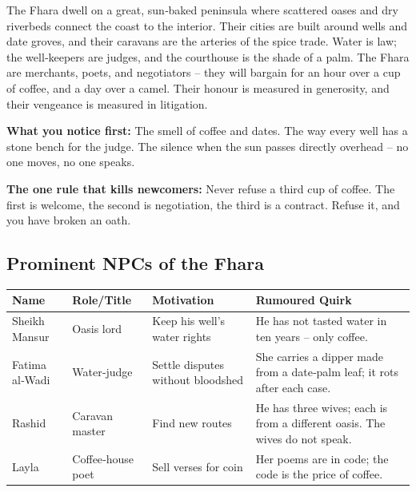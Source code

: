\documentclass[11pt]{book}
\begin{document}
\begin{tcolorbox}[colback=black!3,colframe=blue!60!black,title={Theme \& Atmosphere}]
The Fhara dwell on a great, sun‑baked peninsula where scattered oases and dry riverbeds connect the coast to the interior. Their cities are built around wells and date groves, and their caravans are the arteries of the spice trade. Water is law; the well‑keepers are judges, and the courthouse is the shade of a palm. The Fhara are merchants, poets, and negotiators – they will bargain for an hour over a cup of coffee, and a day over a camel. Their honour is measured in generosity, and their vengeance is measured in litigation.

\vspace{2mm}
\textbf{What you notice first:} The smell of coffee and dates. The way every well has a stone bench for the judge. The silence when the sun passes directly overhead – no one moves, no one speaks.

\textbf{The one rule that kills newcomers:} Never refuse a third cup of coffee. The first is welcome, the second is negotiation, the third is a contract. Refuse it, and you have broken an oath.
\end{tcolorbox}

\subsection*{Prominent NPCs of the Fhara}
\begin{longtable}{|p{}|p{}|p{}|p{}|}
\hline
\textbf{Name} & \textbf{Role/Title} & \textbf{Motivation} & \textbf{Rumoured Quirk} \\
\hline
Sheikh Mansur & Oasis lord & Keep his well’s water rights & He has not tasted water in ten years – only coffee. \\
\hline
Fatima al‑Wadi & Water‑judge & Settle disputes without bloodshed & She carries a dipper made from a date‑palm leaf; it rots after each case. \\
\hline
Rashid & Caravan master & Find new routes & He has three wives; each is from a different oasis. The wives do not speak. \\
\hline
Layla & Coffee‑house poet & Sell verses for coin & Her poems are in code; the code is the price of coffee. \\
\hline
\end{longtable}
\end{document}
